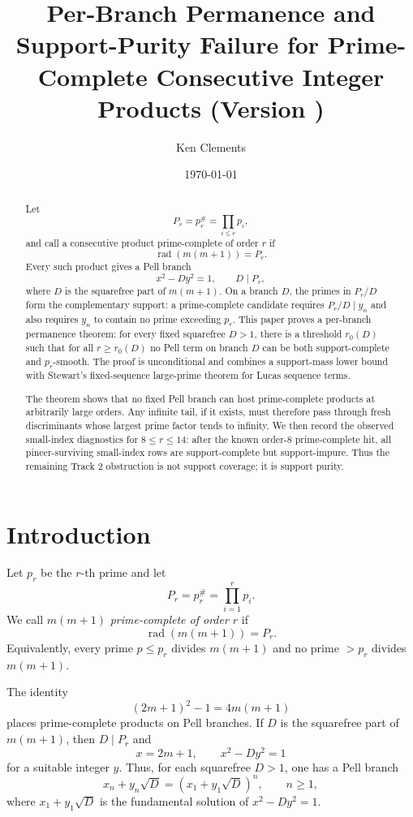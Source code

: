 \documentclass[11pt]{article}
\title{Per-Branch Permanence and Support-Purity Failure
for Prime-Complete Consecutive Integer Products (Version \docversion)}
\author{Ken Clements}
\date{\today}
\theoremstyle{definition}
\DeclareMathOperator{\rad}{rad}
\begin{document}
\maketitle

\begin{abstract}
Let
\[
  P_r=p_r^\#=\prod_{i\le r}p_i,
\]
and call a consecutive product prime-complete of order $r$ if
\[
  \rad(m(m+1))=P_r.
\]
Every such product gives a Pell branch
\[
  x^2-Dy^2=1,
  \qquad D\mid P_r,
\]
where $D$ is the squarefree part of $m(m+1)$.  On a branch $D$, the primes in
$P_r/D$ form the complementary support: a prime-complete candidate requires
$P_r/D\mid y_n$ and also requires $y_n$ to contain no prime exceeding $p_r$.
This paper proves a per-branch permanence theorem: for every fixed squarefree
$D>1$, there is a threshold $r_0(D)$ such that for all $r\ge r_0(D)$ no Pell
term on branch $D$ can be both support-complete and $p_r$-smooth.  The proof is
unconditional and combines a support-mass lower bound with Stewart's fixed-sequence
large-prime theorem for Lucas sequence terms.

The theorem shows that no fixed Pell branch can host prime-complete products at
arbitrarily large orders.  Any infinite tail, if it exists, must therefore pass
through fresh discriminants whose largest prime factor tends to infinity.  We then
record the observed small-index diagnostics for $8\le r\le 14$: after the known
order-$8$ prime-complete hit, all pincer-surviving small-index rows are
support-complete but support-impure.  Thus the remaining Track 2 obstruction is
not support coverage; it is support purity.
\end{abstract}

\section{Introduction}

Let $p_r$ be the $r$-th prime and let
\[
  P_r=p_r^\#=\prod_{i=1}^{r}p_i.
\]
We call $m(m+1)$ \emph{prime-complete of order $r$} if
\[
  \rad(m(m+1))=P_r.
\]
Equivalently, every prime $p\le p_r$ divides $m(m+1)$ and no prime $>p_r$ divides
$m(m+1)$.

The identity
\[
  (2m+1)^2-1=4m(m+1)
\]
places prime-complete products on Pell branches.  If $D$ is the squarefree part
of $m(m+1)$, then $D\mid P_r$ and
\[
  x=2m+1,\qquad x^2-Dy^2=1
\]
for a suitable integer $y$.  Thus, for each squarefree $D>1$, one has a Pell
branch
\[
  x_n+y_n\sqrt D=(x_1+y_1\sqrt D)^n,
  \qquad n\ge 1,
\]
where $x_1+y_1\sqrt D$ is the fundamental solution of $x^2-Dy^2=1$.
\end{document}
